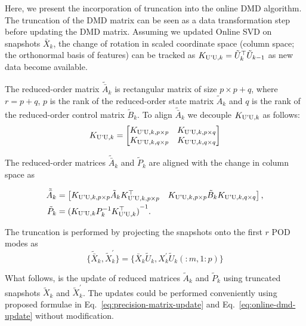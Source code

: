 Here, we present the incorporation of truncation into the online DMD algorithm. The truncation of the DMD matrix can be seen as a data transformation step before updating the DMD matrix. Assuming we updated Online SVD on snapshots \(\bar{X}_k\),
the change of rotation in scaled coordinate space (column space; the orthonormal basis of features) can be tracked as \(K _{\text{U'U}, k} = \tilde{U}_k^\top \tilde{U}_{k-1}\) as new data become available.

The reduced-order matrix \(\tilde{\bar{A}}_k\) is rectangular matrix of size \(p \times p + q\), where \(r = p + q\), \(p\) is the rank of the reduced-order state matrix \(\tilde{A}_k\) and \(q\) is the rank of the reduced-order control matrix \(\tilde{B}_k\). To align \(\tilde{\bar{A}}_k\) we decouple \(K _{\text{U'U}, k}\) as follows:
\begin{equation}
	K _{\text{U'U}, k} = \begin{bmatrix}
		K _{\text{U'U}, k, p \times p} & K _{\text{U'U}, k, p \times q} \\
		K _{\text{U'U}, k, q \times p} & K _{\text{U'U}, k, q \times q}
	\end{bmatrix}
\end{equation}

The reduced-order matrices \(\tilde{\bar{A}}_k\) and \(\tilde{P}_k\) are aligned with the change in column space as

\begin{align}
	\tilde{\bar{A}}_k & = \begin{bmatrix} K _{\text{U'U}, k, p \times p} \tilde{A}_k K _{\text{U'U}, k, p \times p}^\top & K _{\text{U'U}, k, p \times p} \tilde{B}_k K _{\text{U'U}, k, q \times q} \end{bmatrix} , \\
	\tilde{P}_k       & = {(K _{\text{U'U}, k} P_k^{-1} K _{\text{U'U}, k}^\top)}^{-1}.
\end{align}

The truncation is performed by projecting the snapshots onto the first \(r\) POD modes as
\begin{equation}
	\{\tilde{\bar{X}}_k, \tilde{X}^\prime_k\} = \{\bar{X}_k\tilde{U}_k, X^\prime_k\tilde{U}_k(:m, 1:p)\}
\end{equation}

What follows, is the update of reduced matrices \(\tilde{A}_k\) and \(\tilde{P}_k\) using truncated snapshots \(\tilde{X}_k\) and \(\tilde{X}^\prime_k\). The updates could be performed conveniently using proposed formulae in Eq.~\eqref{eq:precision-matrix-update} and Eq.~\eqref{eq:online-dmd-update} without modification.

